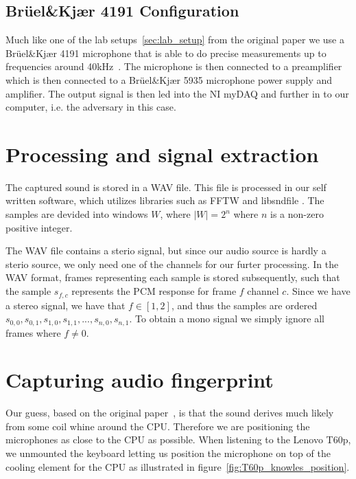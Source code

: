 \subsection{Brüel\&Kjær 4191 Configuration}\label{sec:ch3_bruel_kjaer_configuration}

Much like one of the lab setups~\ref{sec:lab_setup} from the original paper we use a Brüel\&Kjær 4191 microphone that is able to do precise measurements up to frequencies around 40kHz~\cite{bk4191_spec}.
The microphone is then connected to a preamplifier  which is then connected to a Brüel\&Kjær 5935 microphone power supply and amplifier.
The output signal is then led into the NI myDAQ and further in to our computer, i.e. the adversary in this case.

\section{Processing and signal extraction}\label{sec:ch3_processing_signal_extraction}

The captured sound is stored in a WAV file.
This file is processed in our self written software, which utilizes libraries such as FFTW  and libsndfile .
The samples are devided into windows \( W \), where \( \lvert W \rvert = 2^{n} \) where \( n \) is a non-zero positive integer.

The WAV file contains a sterio signal, but since our audio source is hardly a sterio source, we only need one of the channels for our furter processing.  
In the WAV format, frames representing each sample is stored subsequently, such that the sample \( s_{f,c} \) represents the PCM  response for frame \( f \) channel \( c \). 
Since we have a stereo signal, we have that \( f \in \left [ 1, 2 \right ]  \), and thus the samples are ordered  \( s_{0,0}, s_{0,1}, s_{1,0}, s_{1,1}, ... , s_{n,0}, s_{n,1} \). 
To obtain a mono signal we simply ignore all frames where \( f \neq 0 \).

\section{Capturing audio fingerprint}\label{sec:ch3_capturing_audio_fingerprint}

Our guess, based on the original paper~\cite{original_paper}, is that the sound derives much likely from some coil whine around the CPU. 
Therefore we are positioning the microphones as close to the CPU as possible. 
When listening to the Lenovo T60p, we unmounted the keyboard letting us position the microphone on top of the cooling element for the CPU as illustrated in figure~\ref{fig:T60p_knowles_position}. 

